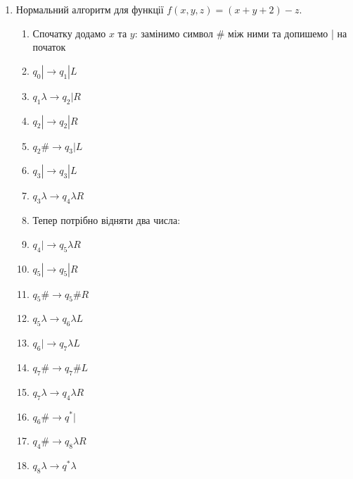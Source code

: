 \documentclass[a4paper, 12pt]{article}
\begin{document}
\begin{enumerate}
{\begin{test-answer-long}

\end{test-answer-long}
\newpage
}
\item{Нормальний алгоритм для функції $f(x, y, z) = (x + y+2) - z.$ }
\begin{test-answer-long}
\begin{enumerate}[]
\item{Спочатку додамо $x$ та $y$: замінимо символ \# між ними та допишемо | на початок}
\item{$q_0| \rightarrow q_1|L$}
\item{$q_1\lambda \rightarrow q_2|R$}
\item{$q_2| \rightarrow q_2|R$}
\item{$q_2\# \rightarrow q_3|L$}
\item{$q_3| \rightarrow q_3|L$}
\item{$q_3\lambda \rightarrow q_4\lambda R$}
\item{Тепер потрібно відняти два числа:}

\item{$q_4|\rightarrow q_5\lambda R$}
\item{$q_5|\rightarrow q_5| R$}
\item{$q_5\#\rightarrow q_5\# R$}
\item{$q_5\lambda \rightarrow q_6\lambda L$}
\item{$q_6|\rightarrow q_7\lambda L$}
\item{$q_7\#\rightarrow q_7\# L$}
\item{$q_7\lambda \rightarrow q_4\lambda R$}
\item{$q_6\#\rightarrow q^{*}|$}
\item{$q_4\#\rightarrow q_8\lambda R$}
\item{$q_8\lambda \rightarrow q^{*}\lambda$}

\end{enumerate}

\end{test-answer-long}
\end{enumerate}
\end{document}
